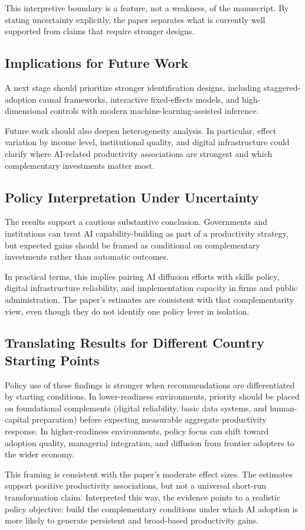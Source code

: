 This interpretive boundary is a feature, not a weakness, of the manuscript. By stating uncertainty explicitly, the paper separates what is currently well supported from claims that require stronger designs.

\subsection{Implications for Future Work}

A next stage should prioritize stronger identification designs, including staggered-adoption causal frameworks, interactive fixed-effects models, and high-dimensional controls with modern machine-learning-assisted inference.

Future work should also deepen heterogeneity analysis. In particular, effect variation by income level, institutional quality, and digital infrastructure could clarify where AI-related productivity associations are strongest and which complementary investments matter most.

\subsection{Policy Interpretation Under Uncertainty}

The results support a cautious substantive conclusion. Governments and institutions can treat AI capability-building as part of a productivity strategy, but expected gains should be framed as conditional on complementary investments rather than automatic outcomes.

In practical terms, this implies pairing AI diffusion efforts with skills policy, digital infrastructure reliability, and implementation capacity in firms and public administration. The paper's estimates are consistent with that complementarity view, even though they do not identify one policy lever in isolation.

\subsection{Translating Results for Different Country Starting Points}

Policy use of these findings is stronger when recommendations are differentiated by starting conditions. In lower-readiness environments, priority should be placed on foundational complements (digital reliability, basic data systems, and human-capital preparation) before expecting measurable aggregate productivity response. In higher-readiness environments, policy focus can shift toward adoption quality, managerial integration, and diffusion from frontier adopters to the wider economy.

This framing is consistent with the paper's moderate effect sizes. The estimates support positive productivity associations, but not a universal short-run transformation claim. Interpreted this way, the evidence points to a realistic policy objective: build the complementary conditions under which AI adoption is more likely to generate persistent and broad-based productivity gains.
